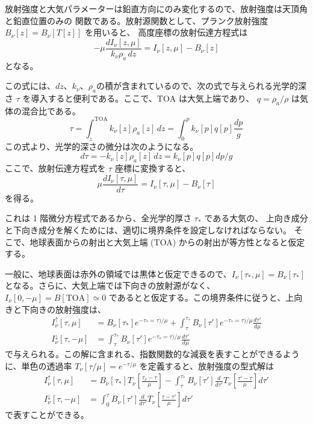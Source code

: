 \documentclass[book]{dennou777}
\begin{document}
放射強度と大気パラメーターは鉛直方向にのみ変化するので、放射強度は天頂角と鉛直位置のみの
関数である。放射源関数として、プランク放射強度 $B_\nu[z]=B_\nu[T[z]]$ を用いると、
高度座標の放射伝達方程式は
\begin{equation}
	-\mu\frac{dI_\nu[z,\mu]}{k_\nu\rho_a\,dz}=I_\nu[z,\mu]-B_\nu[z]
\end{equation}
となる。

この式には、$dz$、$k_\nu$、$\rho_a$の積が含まれているので、次の式で与えられる光学的深さ
$\tau$ を導入すると便利である。ここで、$\mathrm{TOA}$ は大気上端であり、
$q=\rho_a/\rho$ は気体の混合比である。
\begin{equation}
	\tau=\int^{\mathrm{TOA}}_{z} k_\nu[z]\rho_a[z]\,dz=\int^p_0 k_\nu[p]q[p]\frac{dp}{g}
\end{equation}
この式より、光学的深さの微分は次のようになる。
\begin{equation}
	d\tau=-k_\nu[z]\rho_a[z]\,dz=k_\nu[p]q[p]dp/g
\end{equation}
ここで、放射伝達方程式を $\tau$ 座標に変換すると、
\begin{equation}
	\mu\frac{dI_\nu[\tau,\mu]}{d\tau}=I_\nu[\tau,\mu]-B_\nu[\tau]
\end{equation}
を得る。

これは 1 階微分方程式であるから、全光学的厚さ $\tau_*$ である大気の、
上向き成分と下向き成分を解くためには、適切に境界条件を設定しなければならない。
そこで、地球表面からの射出と大気上端 (TOA) からの射出が等方性となると仮定する。

一般に、地球表面は赤外の領域では黒体と仮定できるので、$I_\nu[\tau_*,\mu]=B_\nu[\tau_*]$
となる。さらに、大気上端では下向きの放射源がなく、 $I_\nu[0,-\mu]=B[\mathrm{TOA}]\simeq0$
であるとと仮定する。この境界条件に従うと、上向きと下向きの放射強度は、
\begin{align}
	I^\uparrow_\nu[\tau,\mu]
		&=B_\nu[\tau_*]e^{-\tau_*=\tau)/\mu}
		+\int^{\tau_*}_\tau B_\nu[\tau']e^{-\tau_*=\tau)/\mu}\frac{d\tau'}{d\mu}\\
	I^\downarrow_\nu[\tau,-\mu]
		&=\int^{\tau_*}_\tau B_\nu[\tau']e^{-\tau_*=\tau)/\mu}\frac{d\tau'}{d\mu}
\end{align}
で与えられる。この解に含まれる、指数関数的な減衰を表すことができるように、単色の透過率
$T_\nu[\tau/\mu]=e^{-\tau/\mu}$ を定義すると、放射強度の型式解は
\begin{align}
	I^\uparrow_\nu[\tau,\mu]
		&=B_\nu[\tau_*]T_\nu\left[\frac{\tau_\nu-\tau}{\mu}\right]
		-\int^{\tau_*}_\tau B_\nu[\tau']\frac{d}{d\tau'}T_\nu\left[\frac{\tau'-\tau}{\mu}\right]d\tau'\\
	I^\downarrow_\nu[\tau,-\mu]
		&=\int^\tau_0 B_\nu[\tau']\frac{d}{d\tau'}T_\nu\left[\frac{\tau-\tau'}{\mu}\right]d\tau'
\end{align}
で表すことができる。
\end{document}
